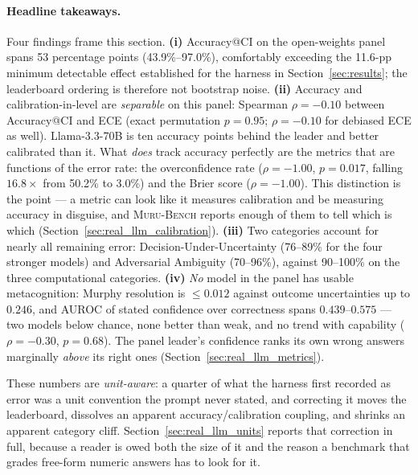 \documentclass{article}
\newcommand{\muru}{\textsc{Muru-Bench}}
\begin{document}
\paragraph{Headline takeaways.}
Four findings frame this section. \textbf{(i)} Accuracy@CI on the open-weights panel spans 53 percentage points (43.9\%--97.0\%), comfortably exceeding the 11.6-pp minimum detectable effect established for the harness in Section~\ref{sec:results}; the leaderboard ordering is therefore not bootstrap noise. \textbf{(ii)} Accuracy and calibration-in-level are \emph{separable} on this panel: Spearman $\rho = -0.10$ between Accuracy@CI and ECE (exact permutation $p = 0.95$; $\rho = -0.10$ for debiased ECE as well). Llama-3.3-70B is ten accuracy points behind the leader and better calibrated than it. What \emph{does} track accuracy perfectly are the metrics that are functions of the error rate: the overconfidence rate ($\rho = -1.00$, $p = 0.017$, falling $16.8\times$ from 50.2\% to 3.0\%) and the Brier score ($\rho = -1.00$). This distinction is the point --- a metric can look like it measures calibration and be measuring accuracy in disguise, and \muru{} reports enough of them to tell which is which (Section~\ref{sec:real_llm_calibration}). \textbf{(iii)} Two categories account for nearly all remaining error: Decision-Under-Uncertainty (76--89\% for the four stronger models) and Adversarial Ambiguity (70--96\%), against 90--100\% on the three computational categories. \textbf{(iv)} \emph{No} model in the panel has usable metacognition: Murphy resolution is $\leq 0.012$ against outcome uncertainties up to $0.246$, and AUROC of stated confidence over correctness spans $0.439$--$0.575$ --- two models below chance, none better than weak, and no trend with capability ($\rho = -0.30$, $p = 0.68$). The panel leader's confidence ranks its own wrong answers marginally \emph{above} its right ones (Section~\ref{sec:real_llm_metrics}).

These numbers are \emph{unit-aware}: a quarter of what the harness first recorded as error was a unit convention the prompt never stated, and correcting it moves the leaderboard, dissolves an apparent accuracy/calibration coupling, and shrinks an apparent category cliff. Section~\ref{sec:real_llm_units} reports that correction in full, because a reader is owed both the size of it and the reason a benchmark that grades free-form numeric answers has to look for it.
\end{document}
